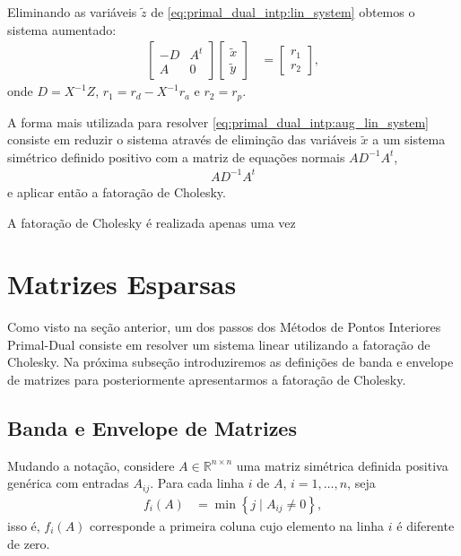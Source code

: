 Eliminando as variáveis $\tilde{z}$ de \eqref{eq:primal_dual_intp:lin_system}
obtemos o sistema aumentado:
\begin{align}
    \begin{bmatrix}
        -D & A^t \\
        A & 0
    \end{bmatrix} \begin{bmatrix}
        \tilde{x} \\
        \tilde{y}
    \end{bmatrix} &= \begin{bmatrix}
        r_1 \\
        r_2
    \end{bmatrix},
    \label{eq:primal_dual_intp:aug_lin_system}
\end{align}
onde $D = X^{-1} Z$, $r_1 = r_d - X^{-1} r_a$ e $r_2 = r_p$.

A forma mais utilizada para resolver \eqref{eq:primal_dual_intp:aug_lin_system}
consiste em reduzir o sistema através de eliminção das variáveis $\tilde{x}$ a
um sistema simétrico definido positivo com a matriz de equações normais $A
D^{-1} A^t$,
\begin{align*}
    A D^{-1} A^t
\end{align*}
e aplicar então a fatoração de Cholesky.

A fatoração de Cholesky é realizada apenas uma vez

\section{Matrizes Esparsas}
Como visto na seção anterior, um dos passos dos Métodos de Pontos Interiores
Primal-Dual consiste em resolver um sistema linear utilizando a fatoração de
Cholesky. Na próxima subseção introduziremos as definições de banda e envelope
de matrizes para posteriormente apresentarmos a fatoração de Cholesky.

\subsection{Banda e Envelope de Matrizes}
Mudando a notação, considere $A \in \mathbb{R}^{n \times n}$ uma matriz
simétrica definida positiva genérica com entradas $A_{ij}$. Para cada linha $i$
de $A$, $i = 1, \ldots, n$, seja
\begin{align*}
    f_i(A) &= \min\left\{ j \mid A_{ij} \neq 0 \right\},
\end{align*}
isso é, $f_i(A)$ corresponde a primeira coluna cujo elemento na linha $i$ é
diferente de zero.

